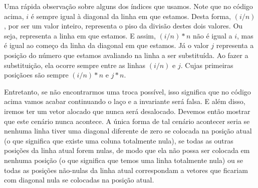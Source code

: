 Uma rápida observação sobre alguns dos índices que usamos. Note que no
código acima, $i$ é sempre igual à diagonal da linha em que
estamos. Desta forma, $(i/n)$, por ser um valor inteiro, representa o
piso da divisão destes dois valores. Ou seja, representa a linha em
que estamos. E assim, $(i/n)*n$ não é igual a $i$, mas é igual ao
começo da linha da diagonal em que estamos. Já o valor $j$ representa
a posição do número que estamos avaliando na linha a ser
substituída. Ao fazer a substituição, ela ocorre sempre entre as
linhas $(i/n)$ e $j$. Cujas primeiras posiçãoes são sempre $(i/n)*n$
e $j*n$.

Entretanto, se não encontrarmos uma troca possível, isso significa que
no código acima vamos acabar continuando o laço e a invariante será
falsa. E além disso, iremos ter um vetor alocado que nunca será
desalocado. Devemos então mostrar que este cenário nunca acontece. A
única forma de tal cenário acontecer seria se nenhuma linha tiver uma
diagonal diferente de zero se colocada na posição atual (o que
significa que existe uma coluna totalmente nula), se todas as outras
posições da linha atual forem nulas, de modo que ela não possa ser
colocada em nenhuma posição (o que significa que temos uma linha
totalmente nula) ou se todas as posições não-nulas da linha atual
correspondam a vetores que ficariam com diagonal nula se colocadas na
posição atual.

\fim



